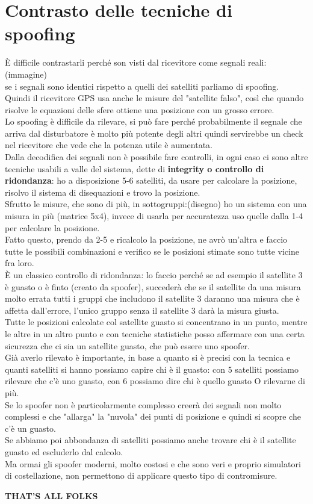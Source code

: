 \documentclass[oneside, 12pt]{extbook}
\begin{document}
\section{Contrasto delle tecniche di spoofing}
È difficile contrastarli perché son visti dal ricevitore come segnali reali:
(immagine)\\
se i segnali sono identici rispetto a quelli dei satelliti parliamo di spoofing.\\
Quindi il ricevitore GPS usa anche le misure del "satellite falso", così che quando risolve le equazioni delle sfere ottiene una posizione con un grosso errore.\\
Lo spoofing è difficile da rilevare, si può fare perché probabilmente il segnale che arriva dal disturbatore è molto più potente degli altri quindi servirebbe un check nel ricevitore che vede che la potenza utile è aumentata.\\
Dalla decodifica dei segnali non è possibile fare controlli, in ogni caso ci sono altre tecniche usabili a valle del sistema, dette di \textbf{integrity o  controllo di ridondanza}: ho a disposizione 5-6 satelliti, da usare per calcolare la posizione, risolvo il sistema di disequazioni e trovo la posizione.\\
Sfrutto le misure, che sono di più, in sottogruppi:(disegno)
ho un sistema con una misura in più (matrice 5x4), invece di usarla per accuratezza uso quelle dalla 1-4 per calcolare la posizione.\\
Fatto questo, prendo da 2-5 e ricalcolo la posizione, ne avrò un'altra e faccio tutte le possibili combinazioni e verifico se le posizioni stimate sono tutte vicine fra loro.\\
È un classico controllo di ridondanza: lo faccio perché se ad esempio il satellite 3 è guasto o è finto (creato da spoofer), succederà che se il satellite da una misura molto errata tutti i gruppi che includono il satellite 3 daranno una misura che è affetta dall'errore, l'unico gruppo senza il satellite 3 darà la misura giusta.\\
Tutte le posizioni calcolate col satellite guasto si concentrano in un punto, mentre le altre in un altro punto e con tecniche statistiche posso affermare con una certa sicurezza che ci sia un satellite guasto, che può essere uno spoofer.\\
Già averlo rilevato è importante, in base a quanto si è precisi con la tecnica e quanti satelliti si hanno possiamo capire chi è il guasto: con 5 satelliti possiamo rilevare che c'è uno guasto, con 6 possiamo dire chi è quello guasto O rilevarne di più.\\
Se lo spoofer non è particolarmente complesso creerà dei segnali non molto complessi e che "allarga" la "nuvola" dei punti di posizione e quindi si scopre che c'è un guasto.\\
Se abbiamo poi abbondanza di satelliti possiamo anche trovare chi è il satellite guasto ed escluderlo dal calcolo.\\
Ma ormai gli spoofer moderni, molto costosi e che sono veri e proprio simulatori di costellazione, non permettono di applicare questo tipo di contromisure.

\Huge
\centering
\textbf{\textsf{THAT'S ALL FOLKS}}
\end{document}
